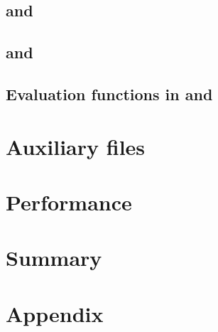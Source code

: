 \documentclass[nojss,shortnames,article]{jss}
\begin{document}
\subsection[de4_0.c and deoptim.cpp]{ and }

\subsection[de4_0.c and devol.cpp]{ and }

\subsection[Evaluation functions in R and C++]{Evaluation functions in  and }

\section{Auxiliary files}

\section{Performance}

\section{Summary}




\section*{Appendix}

\end{document}

